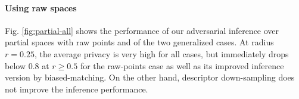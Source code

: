 
\paragraph{Using raw spaces} Fig. \ref{fig:partial-all} shows the performance of our adversarial inference over partial spaces with raw points and of the two generalized cases. %
At radius $r = 0.25$, the average privacy is very high for all cases, but immediately drops below 0.8 at $r \geq 0.5$ for the raw-points case as well as its improved inference version by biased-matching. On the other hand, descriptor down-sampling does not improve the inference performance.


